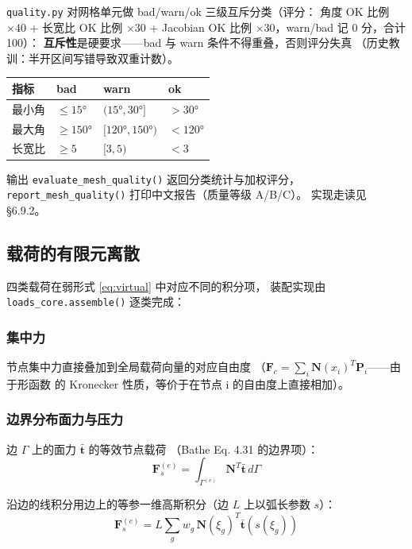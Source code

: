 \documentclass[12pt,a4paper]{ctexart}
\newcommand{\fem}{\Verb}
\begin{document}
\fem|quality.py| 对网格单元做 bad/warn/ok 三级互斥分类（评分：
角度 OK 比例 $\times 40$ + 长宽比 OK 比例 $\times 30$ + Jacobian
OK 比例 $\times 30$，warn/bad 记 0 分，合计 100）：
\textbf{互斥性}是硬要求——bad 与 warn 条件不得重叠，否则评分失真
（历史教训：半开区间写错导致双重计数）。

\begin{table}[h]
\centering
\small
\begin{tabular}{llll}
\toprule
\textbf{指标} & \textbf{bad} & \textbf{warn} & \textbf{ok} \\
\midrule
最小角 & $\le 15°$ & $(15°, 30°]$ & $> 30°$ \\
最大角 & $\ge 150°$ & $[120°, 150°)$ & $< 120°$ \\
长宽比 & $\ge 5$ & $[3, 5)$ & $< 3$ \\
\bottomrule
\end{tabular}
\end{table}

输出 \fem|evaluate_mesh_quality()| 返回分类统计与加权评分，\newline
\fem|report_mesh_quality()| 打印中文报告（质量等级 A/B/C）。
实现走读见 §6.9.2。

\subsection{载荷的有限元离散}

四类载荷在弱形式 \eqref{eq:virtual} 中对应不同的积分项，
装配实现由 \fem|loads_core.assemble()| 逐类完成：

\subsubsection{集中力}

节点集中力直接叠加到全局载荷向量的对应自由度
（$\mathbf{F}_c = \sum_i \mathbf{N}(x_i)^T \mathbf{P}_i$——由于形函数
的 Kronecker 性质，等价于在节点 i 的自由度上直接相加）。

\subsubsection{边界分布面力与压力}

边 $\Gamma$ 上的面力 $\bar{\mathbf{t}}$ 的等效节点载荷
（Bathe Eq. 4.31 的边界项）：
\begin{equation}
\mathbf{F}_s^{(e)} = \int_{\Gamma^{(e)}} \mathbf{N}^T \bar{\mathbf{t}}\,d\Gamma
\end{equation}

沿边的线积分用边上的等参一维高斯积分（边 $L$ 上以弧长参数 $s$）：
\begin{equation}
\mathbf{F}_s^{(e)} = L \sum_{g} w_g\, \mathbf{N}(\xi_g)^T \bar{\mathbf{t}}(s(\xi_g))
\end{equation}
\end{document}
